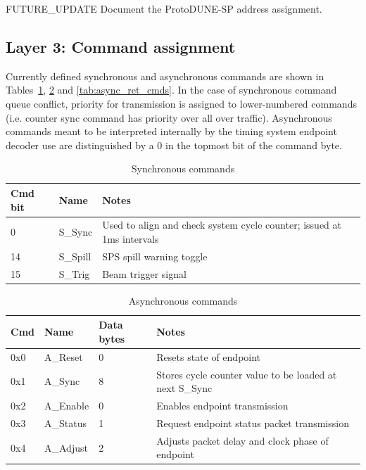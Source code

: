 \documentclass[a4paper,11pt]{article}
\begin{document}
{\color{red}FUTURE\_UPDATE} Document the ProtoDUNE-SP address assignment.

\subsection{Layer 3: Command assignment}

Currently defined synchronous and asynchronous commands are shown in Tables~\ref{tab:sync_cmds}, \ref{tab:async_cmds} and \ref{tab:async_ret_cmds}. In the case of synchronous command queue conflict, priority for transmission is assigned to lower-numbered commands (i.e. counter sync command has priority over all over traffic). Asynchronous commands meant to be interpreted internally by the timing system endpoint decoder use are distinguished by a 0 in the topmost bit of the command byte.

\begin{table}[h!]
  \centering
  \begin{tabular}{@{}llp{9cm}@{}} \toprule
    Cmd bit & Name & Notes\\ \midrule
    0 & S\_Sync & Used to align and check system cycle counter; issued at 1ms intervals \\
    14 & S\_Spill & SPS spill warning toggle \\
    15 & S\_Trig & Beam trigger signal \\ \bottomrule
  \end{tabular}
  \caption{Synchronous commands}
  \label{tab:sync_cmds}
\end{table}

\begin{table}[h!]
  \centering
  \begin{tabular}{@{}lllp{9cm}@{}} \toprule
    Cmd & Name & Data bytes & Notes\\ \midrule
    0x0 & A\_Reset & 0 & Resets state of endpoint \\
    0x1 & A\_Sync & 8 & Stores cycle counter value to be loaded at next S\_Sync \\
    0x2 & A\_Enable & 0 & Enables endpoint transmission \\
    0x3 & A\_Status & 1 & Request endpoint status packet transmission \\ 
    0x4 & A\_Adjust & 2 & Adjusts packet delay and clock phase of endpoint \\ \bottomrule
  \end{tabular}
  \caption{Asynchronous commands}
  \label{tab:async_cmds}
\end{table}
\end{document}
